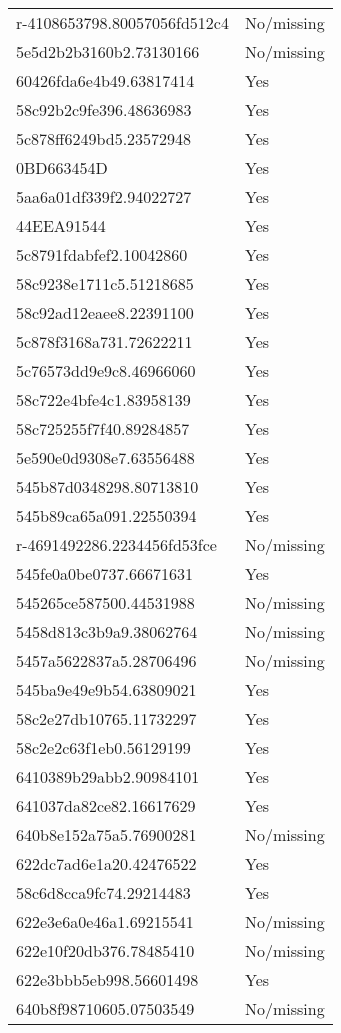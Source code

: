 \begin{tabular}{ll}
r-4108653798.80057056fd512c4 & No/missing \\
5e5d2b2b3160b2.73130166 & No/missing \\
60426fda6e4b49.63817414 & Yes \\
58c92b2c9fe396.48636983 & Yes \\
5c878ff6249bd5.23572948 & Yes \\
0BD663454D & Yes \\
5aa6a01df339f2.94022727 & Yes \\
44EEA91544 & Yes \\
5c8791fdabfef2.10042860 & Yes \\
58c9238e1711c5.51218685 & Yes \\
58c92ad12eaee8.22391100 & Yes \\
5c878f3168a731.72622211 & Yes \\
5c76573dd9e9c8.46966060 & Yes \\
58c722e4bfe4c1.83958139 & Yes \\
58c725255f7f40.89284857 & Yes \\
5e590e0d9308e7.63556488 & Yes \\
545b87d0348298.80713810 & Yes \\
545b89ca65a091.22550394 & Yes \\
r-4691492286.2234456fd53fce & No/missing \\
545fe0a0be0737.66671631 & Yes \\
545265ce587500.44531988 & No/missing \\
5458d813c3b9a9.38062764 & No/missing \\
5457a5622837a5.28706496 & No/missing \\
545ba9e49e9b54.63809021 & Yes \\
58c2e27db10765.11732297 & Yes \\
58c2e2c63f1eb0.56129199 & Yes \\
6410389b29abb2.90984101 & Yes \\
641037da82ce82.16617629 & Yes \\
640b8e152a75a5.76900281 & No/missing \\
622dc7ad6e1a20.42476522 & Yes \\
58c6d8cca9fc74.29214483 & Yes \\
622e3e6a0e46a1.69215541 & No/missing \\
622e10f20db376.78485410 & No/missing \\
622e3bbb5eb998.56601498 & Yes \\
640b8f98710605.07503549 & No/missing \\

\end{tabular}
